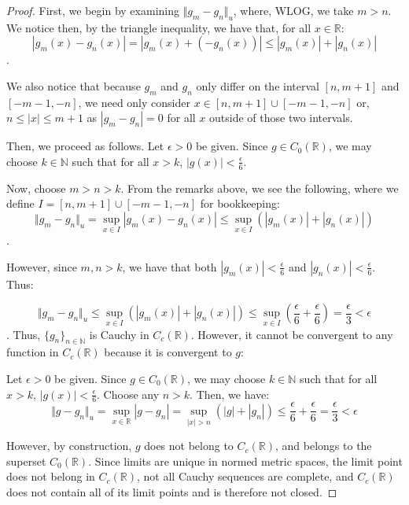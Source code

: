 \documentclass[10pt]{article}
\begin{document}
\begin{proof}[Proof]
First, we begin by examining $\Vert g_m - g_n \Vert_u$, where, WLOG, we take $m > n$. We notice then, by the triangle inequality, we have that, for all $x \in \mathbb{R}$:
$$|g_m(x) - g_n(x)| = |g_m(x) + (-g_n(x))| \leq |g_m(x)| + |g_n(x)|$$.

We also notice that because $g_m$ and $g_n$ only differ on the interval $[n,m+1]$ and $[-m-1, -n]$, we need only consider $x \in [n,m+1] \cup [-m-1,-n]$ or, $ n \leq |x| \leq m+1$  as $|g_m - g_n| = 0$ for all $x$ outside of those two intervals.


Then, we proceed as follows. Let $\epsilon > 0$ be given. Since $g \in C_0(\mathbb{R})$, we may choose $k \in \mathbb{N}$ such that for all $x > k$, $|g(x)| < \frac{\epsilon}{6}$.

Now, choose $m > n > k$. From the remarks above, we see the following, where we define $I =  [n,m+1] \cup [-m-1,-n]$ for bookkeeping:
$$ \Vert g_m - g_n \Vert_u = \sup_{x \in I} |g_m(x) - g_n(x)| \leq \sup_{x \in I} (|g_m(x)| + |g_n(x)|)$$.

 However, since $m,n > k$, we have that both $|g_m(x)| < \frac{\epsilon}{6}$ and $|g_n(x)| < \frac{\epsilon}{6}$. Thus:

$$ \Vert g_m - g_n \Vert_u \leq \sup_{x \in I} (|g_m(x)| + |g_n(x)|) \leq \sup_{x \in I} (\frac{\epsilon}{6} + \frac{\epsilon}{6}) = \frac{\epsilon}{3} < \epsilon $$. Thus,  $\{g_n\}_{n \in \mathbb{N}}$ is Cauchy in $C_c(\mathbb{R})$. However, it cannot be convergent to any function in $C_c(\mathbb{R})$ because it is convergent to $g$:

Let $\epsilon > 0$ be given. Since $g \in C_0(\mathbb{R})$, we may choose $k \in \mathbb{N}$ such that for all $x > k$, $|g(x)| < \frac{\epsilon}{6}$. Choose any $n > k$. Then, we have:
$$ \Vert g - g_n \Vert_u = \sup_{x \in \mathbb{R}} |g - g_n| = \sup_{ |x| > n } (|g|  + | g_n|) \leq \frac{\epsilon}{6} + \frac{\epsilon}{6} = \frac{\epsilon}{3} < \epsilon $$

However, by construction, $g$ does not belong to $C_c(\mathbb{R})$, and belongs to the superset $C_0(\mathbb{R})$. Since limits are unique in normed metric spaces, the limit point does not belong in $C_c(\mathbb{R})$, not all Cauchy sequences are complete, and $C_c(\mathbb{R})$ does not contain all of its limit points and is therefore not closed.
\end{proof}
\end{document}
